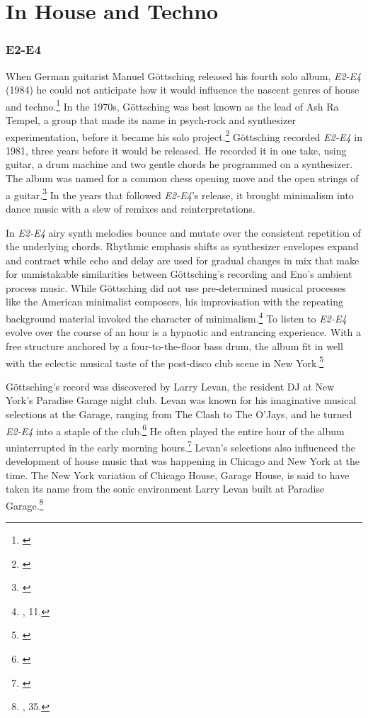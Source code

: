 \documentclass[12pt,twoside]{reedthesis}
\begin{document}
\section{In House and Techno}

\subsubsection{E2-E4}

When German guitarist Manuel G{\"o}ttsching released his fourth solo album, \emph{E2-E4} (1984) he could not anticipate how it would influence the nascent genres of house and techno.\footnote{\cite{manuelgottschingE2E41984}} In the 1970s, G{\"o}ttsching was best known as the lead of Ash Ra Tempel, a group that made its name in psych-rock and synthesizer experimentation, before it became his solo project.\footnote{\cite{AshRaTempel}} G{\"o}ttsching recorded \emph{E2-E4} in 1981, three years before it would be released. He recorded it in one take, using guitar, a drum machine and two gentle chords he programmed on a synthesizer. The album was named for a common chess opening move and the open strings of a guitar.\footnote{\cite{d.straussManuelGottsching2006}} In the years that followed \emph{E2-E4}'s release, it brought minimalism into dance music with a slew of remixes and reinterpretations.

In \emph{E2-E4} airy synth melodies bounce and mutate over the consistent repetition of the underlying chords. Rhythmic emphasis shifts as synthesizer envelopes expand and contract while echo and delay are used for gradual changes in mix that make for unmistakable similarities between G{\"o}ttsching's recording and Eno's ambient process music. While G{\"o}ttsching did not use pre-determined musical processes like the American minimalist composers, his improvisation with the repeating background material invoked the character of minimalism.\footnote{\cite{reichWritingsMusic1974}, 11.} To listen to \emph{E2-E4} evolve over the course of an hour is a hypnotic and entrancing experience. With a free structure anchored by a four-to-the-floor bass drum, the album fit in well with the eclectic musical taste of the post-disco club scene in New York.\footnote{\cite{lawrenceSaturdayMassLarry2014}}

G{\"o}ttsching's record was discovered by Larry Levan, the resident DJ at New York's Paradise Garage night club. Levan was known for his imaginative musical selections at the Garage, ranging from The Clash to The O'Jays, and he turned \emph{E2-E4} into a staple of the club.\footnote{\cite{lawrenceSaturdayMassLarry2014}} He often played the entire hour of the album uninterrupted in the early morning hours.\footnote{\cite{d.straussManuelGottsching2006}} Levan's selections also influenced the development of house music that was happening in Chicago and New York at the time. The New York variation of Chicago House, Garage House, is said to have taken its name from the sonic environment Larry Levan built at Paradise Garage.\footnote{\cite{reynoldsGenerationEcstasyWorld1998}, 35.}
\end{document}
